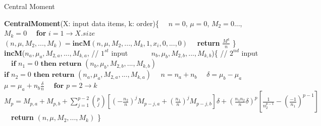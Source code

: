\begin{algorithm}
\caption{Central Moment} 
\label{algo:cm}
\begin{algorithmic}
\small{
\STATE \textbf{CentralMoment}(X: input data items, k: order)\{
\STATE \ \ $n=0$, $\mu=0$, $M_2=0$..., $M_k=0$
\STATE \ \ \textbf{for} $i = 1 \to X.size$ 
\STATE \ \ \ \ $(n, \mu, M_2,...,M_k)=\textbf{incM}(n, \mu, M_2,...,M_k,1, x_i, 0,...,0)$
\STATE \ \ \textbf{return} $\frac{M^k}{n}$ \}
\STATE 
\STATE \textbf{incM}($n_a,\mu_a,M_{2,a},..., M_{k,a}$, // $1^{st}$ input
\STATE \ \ \ \ \ \ $n_b,\mu_b,M_{2,b},..., M_{k,b}$)\{ // $2^{nd}$ input
\STATE \ \ $\textbf{if }n_1=0\textbf{ then return } (n_b,\mu_b,M_{2,b},..., M_{k,b})$
\STATE \ \ $\textbf{if }n_2=0\textbf{ then return } (n_a,\mu_a,M_{2,a},..., M_{k,a})$
\STATE \ \ $n=n_a+n_b$
\STATE \ \ $\delta=\mu_b-\mu_a$
\STATE \ \ $\mu=\mu_a+n_b\frac{\delta}{n}$
\STATE \ \ $\textbf{for } p=2 \to k$
\STATE \ \ \ \ $M_p=M_{p,a}+M_{p,b}+\sum\limits_{j=1}^{p-2}{p \choose j}[(-\frac{n_2}{n})^j M_{p-j,a}+(\frac{n_1}{n})^j M_{p-j,b}]\delta + (\frac{n_1n_2}{n}\delta)^p[\frac{1}{n_2^{p-1}}-(\frac{-1}{n_1})^{p-1}]$
\STATE \ \ \textbf{return} $(n,\mu,M_2,..., M_k)$ \}
}
\end{algorithmic}
\end{algorithm}
